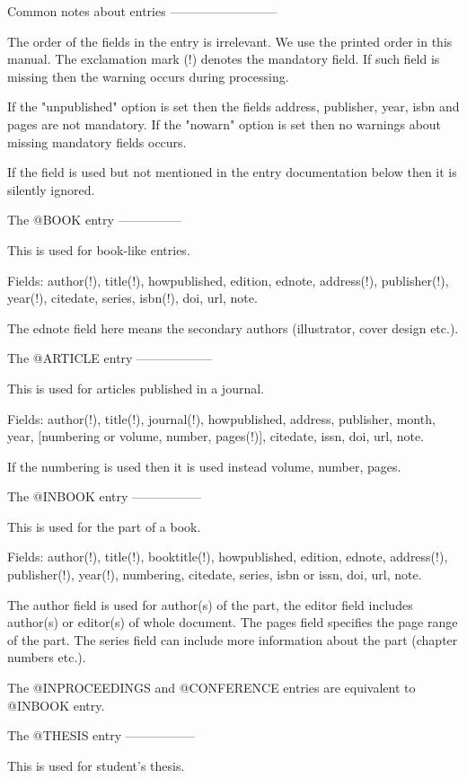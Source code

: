Common notes about entries
--------------------------

The order of the fields in the entry is irrelevant. We use the printed order
in this manual. The exclamation mark (!) denotes the mandatory field. If
such field is missing then the warning occurs during processing.

If the "unpublished" option is set then the fields address, publisher, year,
isbn and pages are not mandatory. If the "nowarn" option is set then no
warnings about missing mandatory fields occurs.

If the field is used but not mentioned in the entry documentation below then
it is silently ignored.

The @BOOK entry
---------------

This is used for book-like entries. 

Fields: author(!), title(!), howpublished, edition, ednote, address(!), 
publisher(!), year(!), citedate, series, isbn(!), doi, url, note. 

The ednote field here means the secondary authors (illustrator, cover design
etc.).


The @ARTICLE entry
------------------

This is used for articles published in a journal. 

Fields: author(!), title(!), journal(!), howpublished, address, publisher,
month, year, [numbering or volume, number, pages(!)], citedate, issn,
doi, url, note. 

If the numbering is used then it is used instead volume, number, pages.


The @INBOOK entry
-----------------

This is used for the part of a book. 

Fields: author(!), title(!), booktitle(!), howpublished, edition, ednote,
address(!), publisher(!), year(!), numbering, citedate, series, isbn or
issn, doi, url, note.

The author field is used for author(s) of the part, the editor field
includes author(s) or editor(s) of whole document. The pages field specifies
the page range of the part. The series field can include more information
about the part (chapter numbers etc.).

The @INPROCEEDINGS and @CONFERENCE entries are equivalent to @INBOOK entry.


The @THESIS entry
-----------------

This is used for student's thesis. 

